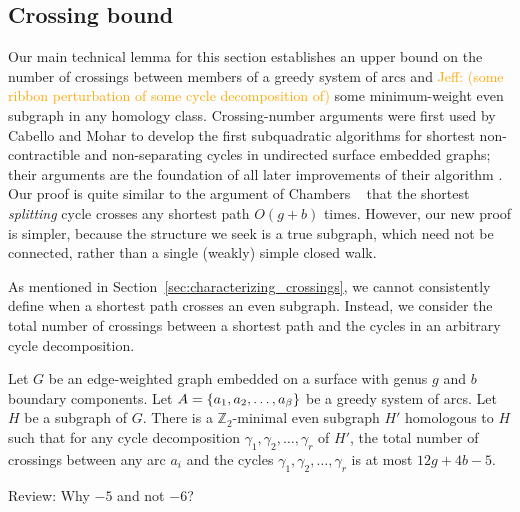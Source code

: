 \documentclass[letterpaper,review]{siamart190516}
\def\Z{\mathbb{Z}}
\def\rnote#1{\color{red}Review: #1 \color{black}}
\def\jnote#1{\textcolor{orange}{Jeff: #1}}
\begin{document}
\subsection{Crossing bound}
\label{SS:homotopy-crossing}

Our main technical lemma for this section establishes an upper bound on the number of crossings
between members of a greedy system of arcs and \jnote{(some ribbon perturbation of some cycle decomposition of)} some minimum-weight even subgraph in any homology class.  Crossing-number arguments were first used by Cabello and Mohar \cite{cm-fsnsn-07} to develop the first subquadratic algorithms for shortest non-contractible and non-separating cycles in undirected surface embedded graphs; their arguments are the foundation of all later improvements of their algorithm \cite{c-mdpg-06, k-csnco-06, cce-msspe-13}.  Our proof is quite similar to the argument of Chambers \etal~\cite{ccelw-scsih-08} that the shortest \emph{splitting} cycle crosses any shortest path $O(g+b)$ times.  However, our new proof is simpler, because the structure we seek is a true subgraph, which need not be connected, rather than a single (weakly) simple closed walk.

As mentioned in Section~\ref{sec:characterizing_crossings}, we cannot consistently define when a shortest path crosses an even subgraph.  Instead, we consider the total number of crossings between a shortest path and the cycles in an arbitrary cycle decomposition.

\begin{lemma}
\label{lem:crossing}
Let $G$ be an edge-weighted graph embedded on a surface with genus $g$ and $b$ boundary components.
Let $A = \left\{ a_1, a_2, \dots, a_\beta \right\}$ be a greedy system of arcs.
Let $H$ be a subgraph of $G$.
There is a $\Z_2$-minimal even subgraph $H'$ homologous to $H$ such that for any cycle decomposition
$\gamma_1, \gamma_2, \dots, \gamma_r$ of $H'$, the total number of crossings between any arc $a_i$
and the cycles $\gamma_1, \gamma_2, \dots, \gamma_r$ is at most $12g+4b-5$.

\rnote{
Why $-5$ and not $-6$? 
}
\end{lemma}

\end{document}
